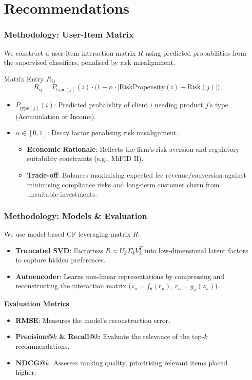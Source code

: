 \documentclass[aspectratio=169]{beamer}
\begin{document}
\section{Recommendations}

\begin{frame}
	\frametitle{Methodology: User-Item Matrix}
	We construct a user-item interaction matrix $R$ using predicted probabilities from the supervised classifiers, penalised by risk misalignment.

	\begin{block}{Matrix Entry $R_{ij}$}
		$$
			R_{ij} = P_{\text{type}(j)}(i) \cdot \big(1 - \alpha \cdot | \text{RiskPropensity}(i) - \text{Risk}(j) |\big)
		$$
	\end{block}

	\begin{itemize}
		\item $P_{\text{type}(j)}(i)$: Predicted probability of client $i$ needing product $j$'s type (Accumulation or Income).
		\item $\alpha \in [0,1]$: Decay factor penalising risk misalignment.
		      \begin{itemize}
			      \item \textbf{Economic Rationale}: Reflects the firm's risk aversion and regulatory suitability constraints (e.g., MiFID II).
			      \item \textbf{Trade-off}: Balances maximising expected fee revenue/conversion against minimising compliance risks and long-term customer churn from unsuitable investments.
		      \end{itemize}
	\end{itemize}
\end{frame}

\begin{frame}
	\frametitle{Methodology: Models \& Evaluation}
	We use model-based CF \cite{sharaf_survey_2022} leveraging matrix $R$:

	\begin{itemize}
		\item \textbf{Truncated SVD}: Factorises $R \approx U_k \Sigma_k V_k^T$ into low-dimensional latent factors to capture hidden preferences.
		\item \textbf{Autoencoder}: Learns non-linear representations by compressing and reconstructing the interaction matrix ($z_u = f_\theta(r_u)$, $\hat{r}_u = g_\phi(z_u)$).
	\end{itemize}

	\vspace{0.3cm}
	\textbf{Evaluation Metrics}
	\begin{itemize}
		\item \textbf{RMSE}: Measures the model's reconstruction error.
		\item \textbf{Precision@$k$ \& Recall@$k$}: Evaluate the relevance of the top-$k$ recommendations.
		\item \textbf{NDCG@$k$}: Assesses ranking quality, prioritising relevant items placed higher.
	\end{itemize}
\end{frame}
\end{document}

